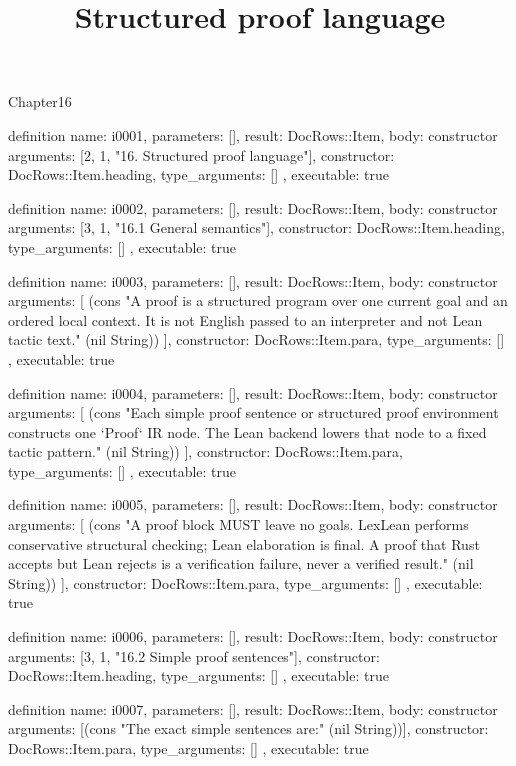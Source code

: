 \begin{lexlean}{Chapter16}
\title{Structured proof language}
\begin{semanticmodule}
definition{
  name: i0001,
  parameters: [],
  result: DocRows::Item,
  body: constructor{
    arguments: [2, 1, "16. Structured proof language"],
    constructor: DocRows::Item.heading,
    type_arguments: []
  },
  executable: true
}

definition{
  name: i0002,
  parameters: [],
  result: DocRows::Item,
  body: constructor{
    arguments: [3, 1, "16.1 General semantics"],
    constructor: DocRows::Item.heading,
    type_arguments: []
  },
  executable: true
}

definition{
  name: i0003,
  parameters: [],
  result: DocRows::Item,
  body: constructor{
    arguments: [
      (cons "A proof is a structured program over one current goal and an ordered local context. It is not English passed to an interpreter and not Lean tactic text." (nil String))
    ],
    constructor: DocRows::Item.para,
    type_arguments: []
  },
  executable: true
}

definition{
  name: i0004,
  parameters: [],
  result: DocRows::Item,
  body: constructor{
    arguments: [
      (cons "Each simple proof sentence or structured proof environment constructs one `Proof` IR node. The Lean backend lowers that node to a fixed tactic pattern." (nil String))
    ],
    constructor: DocRows::Item.para,
    type_arguments: []
  },
  executable: true
}

definition{
  name: i0005,
  parameters: [],
  result: DocRows::Item,
  body: constructor{
    arguments: [
      (cons "A proof block MUST leave no goals. LexLean performs conservative structural checking; Lean elaboration is final. A proof that Rust accepts but Lean rejects is a verification failure, never a verified result." (nil String))
    ],
    constructor: DocRows::Item.para,
    type_arguments: []
  },
  executable: true
}

definition{
  name: i0006,
  parameters: [],
  result: DocRows::Item,
  body: constructor{
    arguments: [3, 1, "16.2 Simple proof sentences"],
    constructor: DocRows::Item.heading,
    type_arguments: []
  },
  executable: true
}

definition{
  name: i0007,
  parameters: [],
  result: DocRows::Item,
  body: constructor{
    arguments: [(cons "The exact simple sentences are:" (nil String))],
    constructor: DocRows::Item.para,
    type_arguments: []
  },
  executable: true
}


\end{semanticmodule}
\end{lexlean}
